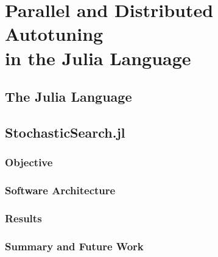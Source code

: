 \chapter[Parallel and Distributed Autotuning in the Julia Language]{Parallel and Distributed Autotuning \\ in the Julia Language}
\label{chap:julia}

\section{The Julia Language}
\label{sec:julia}

\section{StochasticSearch.jl}
\label{sec:ss}

\subsection{Objective}
\label{subsec:obj}

\subsection{Software Architecture}
\label{subsec:arch}

\subsection{Results}
\label{subsec:res}

\subsection{Summary and Future Work}
\label{subsec:concl}
